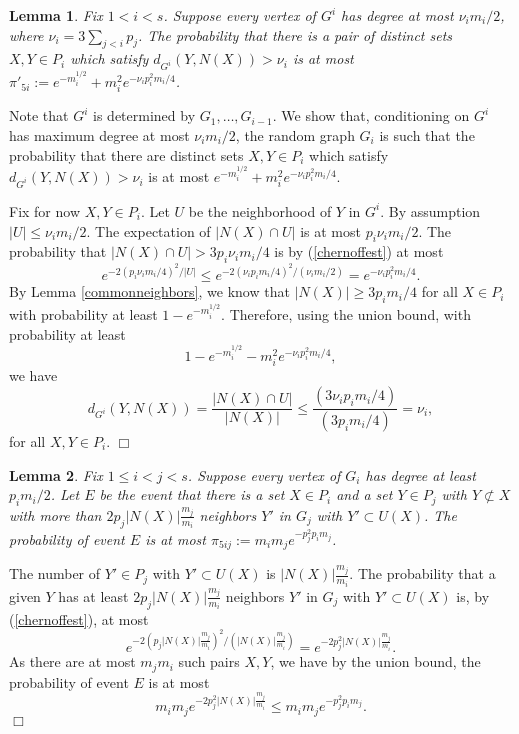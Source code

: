 \documentclass[11pt]{article}
\newtheorem{lemma}{Lemma}[section]
\newenvironment{proof}
      {\medskip\noindent{\bf Proof:}\hspace{1mm}}
      {\hfill$\Box$\medskip}
\begin{document}
\begin{lemma}\label{puttog1}
Fix $1 < i < s$. Suppose every vertex of $G^i$ has degree at most $\nu_im_i/2$,
where $\nu_i=3\sum_{j<i}p_j$. The probability that there is a pair of distinct
sets $X,Y \in P_i$ which satisfy $d_{G^i}(Y,N(X)) > \nu_i$ is at most
$\pi'_{5i}:=e^{-m_i^{1/2}} + m_i^2 e^{- \nu_i p_i^2 m_i/4}$.
\end{lemma}
\begin{proof}
Note that $G^i$ is determined by $G_1,\ldots,G_{i-1}$. We show that,
conditioning on $G^i$ has maximum degree at most $\nu_i m_i/2$, the random
graph $G_i$ is such that the probability that there are distinct sets $X,Y \in
P_i$ which satisfy $d_{G^i}(Y,N(X))>\nu_i$ is at most $e^{-m_i^{1/2}} + m_i^2 e^{- \nu_i p_i^2 m_i/4}$.

Fix for now $X,Y \in P_i$. Let $U$ be the neighborhood of $Y$ in $G^i$. By
assumption $|U| \leq
\nu_im_i/2$. The expectation of $|N(X) \cap U|$ is at most $p_i \nu_i m_i/2$.
The probability that $|N(X) \cap U| > 3 p_i \nu_i m_i/4$ is by
(\ref{chernoffest}) at most $$e^{-2(p_i \nu_i  m_i/4)^2/|U|} \leq e^{-2(\nu_i
p_i m_i/4)^2/(\nu_i m_i/2)} = e^{-\nu_i p_i^2 m_i/4}.$$ By Lemma
\ref{commonneighbors}, we know that $|N(X)| \geq 3p_i m_i/4$ for all $X \in
P_i$ with probability at least $1 - e^{-m_i^{1/2}}$. Therefore, using
the union bound, with probability at least $$1 - e^{-m_i^{1/2}} -
m_i^2 e^{-\nu_i p_i^2 m_i/4},$$ we
have
\[d_{G^i} (Y, N(X)) = \frac{|N(X) \cap U|}{|N(X)|} \leq \frac{(3 \nu_i p_i
m_i/4)}{(3 p_i m_i/4)} = \nu_i,\]
for all $X, Y \in P_i$.
\end{proof}

\begin{lemma}\label{puttog2}
Fix $1 \leq i < j < s$. Suppose every vertex of $G_i$ has degree at least $p_i
m_i/2$. Let $E$ be the event that there is a set $X \in P_i$ and a set $Y
\in P_j$ with $Y \not \subset X$ with more than $2p_j|N(X)|\frac{m_j}{m_i}$
neighbors $Y'$ in $G_j$ with $Y' \subset U(X)$. The probability of event $E$ is
at most $\pi_{5ij}:=m_im_je^{-p_j^2p_im_j}$.
\end{lemma}
\begin{proof}
The number of $Y' \in P_j$ with $Y' \subset U(X)$ is $|N(X)|\frac{m_j}{m_i}$.
The probability that a given $Y$ has at least $2p_j|N(X)|\frac{m_j}{m_i}$
neighbors $Y'$ in $G_j$ with $Y' \subset U(X)$ is, by (\ref{chernoffest}), at
most
$$e^{-2\left(p_j|N(X)|\frac{m_j}{m_i}\right)^2/\left(|N(X)|\frac{m_j}{m_i}\right)}
=
e^{-2p_j^2|N(X)|\frac{m_j}{m_i}}.$$ As there are at most $m_jm_i$ such pairs
$X,Y$, we have by the union bound, the probability of event $E$ is at most
$$m_im_je^{-2p_j^2|N(X)|\frac{m_j}{m_i}} \leq m_im_je^{-p_j^2p_im_j}.$$
\end{proof}
\end{document}
